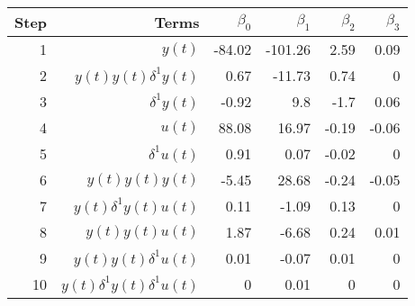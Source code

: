 \begin{tabular}{rrrrrr}
Step & Terms & $\beta_{0}$ & $\beta_{1}$ & $\beta_{2}$ & $\beta_{3}$ \\ 
\hline 
1 & $y(t)$ & -84.02 & -101.26 & 2.59 & 0.09 \\ 
2 & $y(t)y(t)\delta^1 y(t)$ & 0.67 & -11.73 & 0.74 & 0 \\ 
3 & $\delta^1 y(t)$ & -0.92 & 9.8 & -1.7 & 0.06 \\ 
4 & $u(t)$ & 88.08 & 16.97 & -0.19 & -0.06 \\ 
5 & $\delta^1 u(t)$ & 0.91 & 0.07 & -0.02 & 0 \\ 
6 & $y(t)y(t)y(t)$ & -5.45 & 28.68 & -0.24 & -0.05 \\ 
7 & $y(t)\delta^1 y(t)u(t)$ & 0.11 & -1.09 & 0.13 & 0 \\ 
8 & $y(t)y(t)u(t)$ & 1.87 & -6.68 & 0.24 & 0.01 \\ 
9 & $y(t)y(t)\delta^1 u(t)$ & 0.01 & -0.07 & 0.01 & 0 \\ 
10 & $y(t)\delta^1 y(t)\delta^1 u(t)$ & 0 & 0.01 & 0 & 0 \\ 
\hline 
\end{tabular}